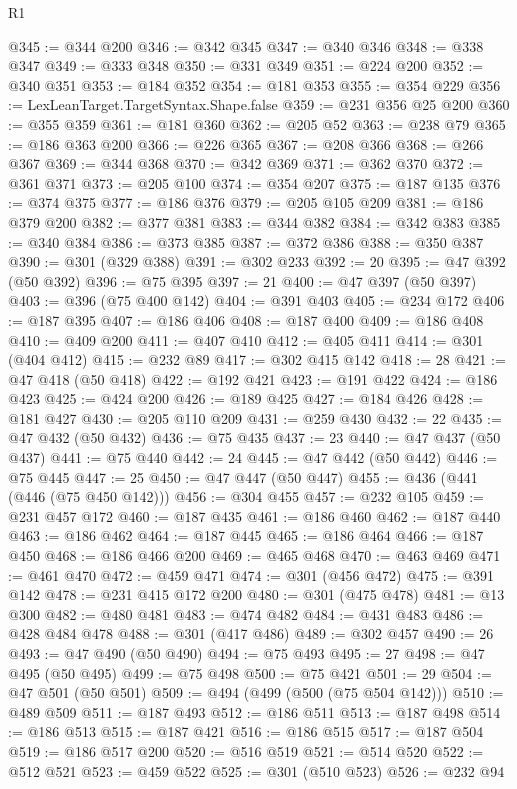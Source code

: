 \begin{lexlean}{R1}
\begin{coremodule}
@345 := @344 @200
@346 := @342 @345
@347 := @340 @346
@348 := @338 @347
@349 := @333 @348
@350 := @331 @349
@351 := @224 @200
@352 := @340 @351
@353 := @184 @352
@354 := @181 @353
@355 := @354 @229
@356 := LexLeanTarget.TargetSyntax.Shape.false
@359 := @231 @356 @25 @200
@360 := @355 @359
@361 := @181 @360
@362 := @205 @52
@363 := @238 @79
@365 := @186 @363 @200
@366 := @226 @365
@367 := @208 @366
@368 := @266 @367
@369 := @344 @368
@370 := @342 @369
@371 := @362 @370
@372 := @361 @371
@373 := @205 @100
@374 := @354 @207
@375 := @187 @135
@376 := @374 @375
@377 := @186 @376
@379 := @205 @105 @209
@381 := @186 @379 @200
@382 := @377 @381
@383 := @344 @382
@384 := @342 @383
@385 := @340 @384
@386 := @373 @385
@387 := @372 @386
@388 := @350 @387
@390 := @301 (@329 @388)
@391 := @302 @233
@392 := 20
@395 := @47 @392 (@50 @392)
@396 := @75 @395
@397 := 21
@400 := @47 @397 (@50 @397)
@403 := @396 (@75 @400 @142)
@404 := @391 @403
@405 := @234 @172
@406 := @187 @395
@407 := @186 @406
@408 := @187 @400
@409 := @186 @408
@410 := @409 @200
@411 := @407 @410
@412 := @405 @411
@414 := @301 (@404 @412)
@415 := @232 @89
@417 := @302 @415 @142
@418 := 28
@421 := @47 @418 (@50 @418)
@422 := @192 @421
@423 := @191 @422
@424 := @186 @423
@425 := @424 @200
@426 := @189 @425
@427 := @184 @426
@428 := @181 @427
@430 := @205 @110 @209
@431 := @259 @430
@432 := 22
@435 := @47 @432 (@50 @432)
@436 := @75 @435
@437 := 23
@440 := @47 @437 (@50 @437)
@441 := @75 @440
@442 := 24
@445 := @47 @442 (@50 @442)
@446 := @75 @445
@447 := 25
@450 := @47 @447 (@50 @447)
@455 := @436 (@441 (@446 (@75 @450 @142)))
@456 := @304 @455
@457 := @232 @105
@459 := @231 @457 @172
@460 := @187 @435
@461 := @186 @460
@462 := @187 @440
@463 := @186 @462
@464 := @187 @445
@465 := @186 @464
@466 := @187 @450
@468 := @186 @466 @200
@469 := @465 @468
@470 := @463 @469
@471 := @461 @470
@472 := @459 @471
@474 := @301 (@456 @472)
@475 := @391 @142
@478 := @231 @415 @172 @200
@480 := @301 (@475 @478)
@481 := @13 @300
@482 := @480 @481
@483 := @474 @482
@484 := @431 @483
@486 := @428 @484 @478
@488 := @301 (@417 @486)
@489 := @302 @457
@490 := 26
@493 := @47 @490 (@50 @490)
@494 := @75 @493
@495 := 27
@498 := @47 @495 (@50 @495)
@499 := @75 @498
@500 := @75 @421
@501 := 29
@504 := @47 @501 (@50 @501)
@509 := @494 (@499 (@500 (@75 @504 @142)))
@510 := @489 @509
@511 := @187 @493
@512 := @186 @511
@513 := @187 @498
@514 := @186 @513
@515 := @187 @421
@516 := @186 @515
@517 := @187 @504
@519 := @186 @517 @200
@520 := @516 @519
@521 := @514 @520
@522 := @512 @521
@523 := @459 @522
@525 := @301 (@510 @523)
@526 := @232 @94

\end{coremodule}
\end{lexlean}
